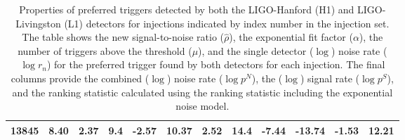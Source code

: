 \begin{table}[ht]
\begin{tabular}{lccccccccccc}
        13845 & 8.40 & 2.37 & 9.4 & -2.57 & 10.37 & 2.52 & 14.4 & -7.44 & -13.74 & -1.53 & 12.21 \\
        \bottomrule
    \end{tabular}
    \caption{Properties of preferred triggers detected by both the LIGO-Hanford (H1) and LIGO-Livingston (L1) detectors for injections indicated by index number in the injection set. The table shows the new signal-to-noise ratio ($\hat{\rho}$), the exponential fit factor ($\alpha$), the number of triggers above the threshold ($\mu$), and the single detector ($\log$) noise rate ($\log r_n$) for the preferred trigger found by both detectors for each injection. The final columns provide the combined ($\log$) noise rate ($\log p^{N}$), the ($\log$) signal rate ($\log p^{S}$), and the ranking statistic calculated using the ranking statistic including the exponential noise model.}
    \label{5:tab:top-right-same-trigs-fits}
\end{table}
%


